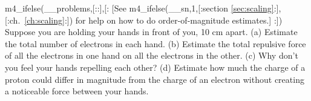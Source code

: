 m4_ifelse(__problems,[::],[:%
[See m4_ifelse(__sn,1,[:section \ref{sec:scaling}:],[:ch.~\ref{ch:scaling}:])
for help on how to do order-of-magnitude
estimates.]%
:])%
        Suppose you are holding your hands in front of you, 10 cm apart.\hwendpart
        (a) Estimate the total number of electrons in each hand.\hwendpart
        (b) Estimate the total repulsive force of all the electrons
        in one hand on all the electrons in the other.\hwendpart
        (c) Why don't you feel your hands repelling each other?\hwendpart
        (d) Estimate how much the charge of a proton could differ in
        magnitude from the charge of an electron without creating a
        noticeable force between your hands.
